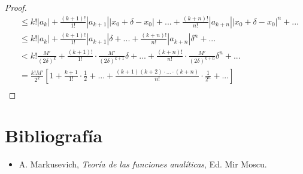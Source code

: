 \documentclass[12pt]{report}
\theoremstyle{largebreak}
\newcommand\abs[1]{\ensuremath{\left|#1\right|}}
\begin{document}
\begin{proof}
\begin{equation*}
\begin{split}
                &\leq k!\abs{a_k}+\frac{(k+1)!}{1!}\abs{a_{ k+1}}\abs{x_0+\delta-x_0}+...+\frac{(k+n)!}{n!}\abs{a_{ k+n}}\abs{x_0+\delta-x_0}^n+...\\
                &\leq k!\abs{a_k}+\frac{(k+1)!}{1!}\abs{a_{ k+1}}\delta+...+\frac{(k+n)!}{n!}\abs{a_{ k+n}}\delta^n+...\\
                &< k!\frac{M'}{(2\delta)^k}+\frac{(k+1)!}{1!}\cdot\frac{M'}{(2\delta)^{ k+1}}\delta+...+\frac{(k+n)!}{n!}\cdot\frac{M'}{(2\delta)^{ k+n}}\delta^n+...\\
                &=\frac{k!M'}{2^k}\left[1+\frac{k+1}{1!}\cdot\frac{1}{2}+...+\frac{(k+1)(k+2)\cdot...\cdot(k+n)}{n!}\cdot\frac{1}{2^n}+... \right]\\
            \end{split}
        \end{equation*}

    \end{proof}

    

    \chapter*{Bibliografía}

    \begin{itemize}
        \item A. Markusevich, \textit{Teoría de las funciones analíticas}, Ed. Mir Moscu.
    \end{itemize}
    
\end{document}

